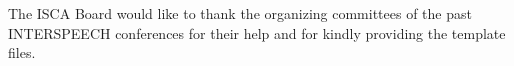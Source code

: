 \documentclass[a4paper]{article}
\begin{document}
    The ISCA Board would like to thank the organizing committees of the past INTERSPEECH conferences for their help and for kindly providing the template files.


  \newpage
  \eightpt
  

  

\end{document}

